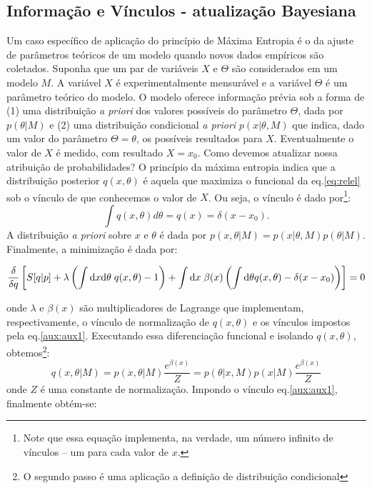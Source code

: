 \subsection{Informação e Vínculos - atualização Bayesiana}
\label{sec:bayes}
Um caso específico de aplicação do princípio de Máxima Entropia é o da ajuste de parâmetros teóricos de um modelo quando novos dados empíricos são coletados. Suponha que um par de variáveis $X$ e $\Theta$ são considerados em um modelo $M$. A variável $X$ é experimentalmente mensurável e a variável $\Theta$ é um parâmetro teórico do modelo. O modelo oferece informação prévia sob a forma de (1) uma distribuição \emph{a priori} dos valores possíveis do parâmetro $\Theta$, dada por $p(\theta | M)$ e (2) uma distribuição condicional \emph{a priori}  $p(x | \theta, M)$ que indica, dado um valor do parâmetro $\Theta = \theta$, os possíveis resultados para $X$. Eventualmente o valor de $X$ é medido, com resultado $X = x_0$. Como devemos atualizar nossa atribuição de probabilidades? O princípio da máxima entropia indica que a distribuição posterior $q(x,\theta)$ é aquela que maximiza o funcional da eq.\eqref{eq:relel} sob o vínculo de que conhecemos o valor de $X$. Ou seja, o vínculo é dado por\footnote{Note que essa equação implementa, na verdade, um número infinito de vínculos -- um para cada valor de $x$.}:
\begin{equation}
\label{aux:aux1}
 \int q(x, \theta) d\theta = q(x) = \delta(x-x_0).
\end{equation}
 A distribuição \emph{a priori} sobre $x$ e $\theta$ é dada por $p(x, \theta| M) = p(x|\theta, M) p(\theta| M)$. Finalmente, a minimização é dada por:
\begin{fullwidth}
\[
 \frac{\delta}{\delta q} \left[S[q | p] + \lambda \left(\int \mathrm{d} x\mathrm{d}\theta\; q(x,\theta) -1 \right) + \int \mathrm{d} x\; \beta(x) \left(\int\mathrm{d}\theta q(x,\theta) - \delta(x-x_0)\right)\right] =0
\]
\end{fullwidth}
onde $\lambda$ e $\beta(x)$ são multiplicadores de Lagrange que implementam, respectivamente, o vínculo de normalização de $q(x,\theta)$ e os vínculos impostos pela eq.\eqref{aux:aux1}. Executando essa diferenciação funcional e isolando $q(x,\theta)$, obtemos\footnote{O segundo passo é uma aplicação a definição de distribuição condicional}:
\begin{equation}
 q(x,\theta| M) = p(x,\theta| M)\frac{e^{\beta(x)}}{Z} = p(\theta|x, M)p(x |M)\frac{e^{\beta(x)}}{Z}
\end{equation}
onde $Z$ é uma constante de normalização. Impondo o vínculo eq.\eqref{aux:aux1}, finalmente obtém-se:
